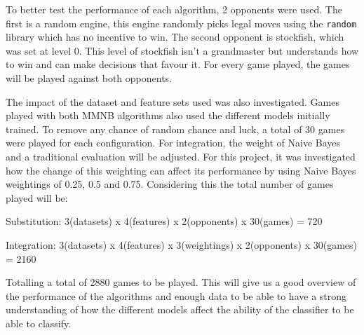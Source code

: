 To better test the performance of each algorithm, 2 opponents were used. The first is a random engine, this engine randomly picks legal moves using the \texttt{random} library which has no incentive to win. The second opponent is stockfish, which was set at level 0. This level of stockfish isn't a grandmaster but understands how to win and can make decisions that favour it. For every game played, the games will be played against both opponents.

The impact of the dataset and feature sets used was also investigated. Games played with both MMNB algorithms also used the different models initially trained. To remove any chance of random chance and luck, a total of 30 games were played for each configuration. For integration, the weight of Naive Bayes and a traditional evaluation will be adjusted. For this project, it was investigated how the change of this weighting can affect its performance by using Naive Bayes weightings of 0.25, 0.5 and 0.75. Considering this the total number of games played will be:

Substitution: 3(datasets) x 4(features) x 2(opponents) x 30(games) = 720

Integration: 3(datasets) x 4(features) x 3(weightings) x 2(opponents) x 30(games) = 2160

Totalling a total of 2880 games to be played. This will give us a good overview of the performance of the algorithms and enough data to be able to have a strong understanding of how the different models affect the ability of the classifier to be able to classify. 




